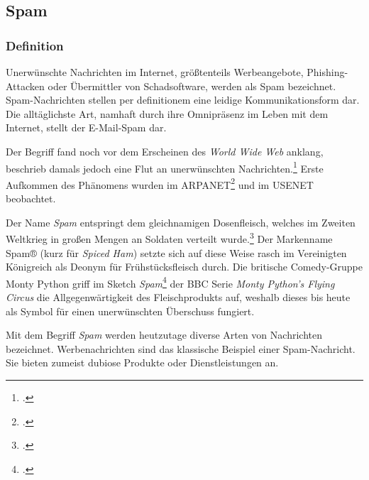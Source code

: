 \subsection{Spam} %
\label{sub:spam}
\subsubsection{Definition} %
\label{ssub:definition}
Unerwünschte Nachrichten im Internet, größtenteils Werbeangebote, Phishing-Attacken oder Übermittler von Schadsoftware, werden als Spam bezeichnet.
Spam-Nachrichten stellen per definitionem eine leidige Kommunikationsform dar. Die alltäglichste Art, namhaft durch ihre Omnipräsenz im Leben mit dem Internet, stellt der E-Mail-Spam dar.

Der Begriff fand noch vor dem Erscheinen des \emph{World Wide Web} anklang, beschrieb damals jedoch eine Flut an unerwünschten Nachrichten.\footcite{originTermSpam}
Erste Aufkommen des Phänomens wurden im ARPANET\footcite{junkMailProblem} und im USENET beobachtet.

Der Name \emph{Spam} entspringt dem gleichnamigen Dosenfleisch, welches im Zweiten Weltkrieg in großen Mengen an Soldaten verteilt wurde.\footcite{lifeDuringSecondWW}
Der Markenname Spam® (kurz für \emph{Spiced Ham}) setzte sich auf diese Weise rasch im Vereinigten Königreich als Deonym für Frühstücksfleisch durch.
Die britische Comedy-Gruppe Monty Python griff im Sketch \emph{Spam}\footcite{spamMontyPython} der BBC Serie \emph{Monty Python’s Flying Circus} die Allgegenwärtigkeit des Fleischprodukts auf, weshalb dieses bis heute als Symbol für einen unerwünschten Überschuss fungiert.

Mit dem Begriff \emph{Spam} werden heutzutage diverse Arten von Nachrichten bezeichnet.
Werbenachrichten sind das klassische Beispiel einer Spam-Nachricht.
Sie bieten zumeist dubiose Produkte oder Dienstleistungen an.
